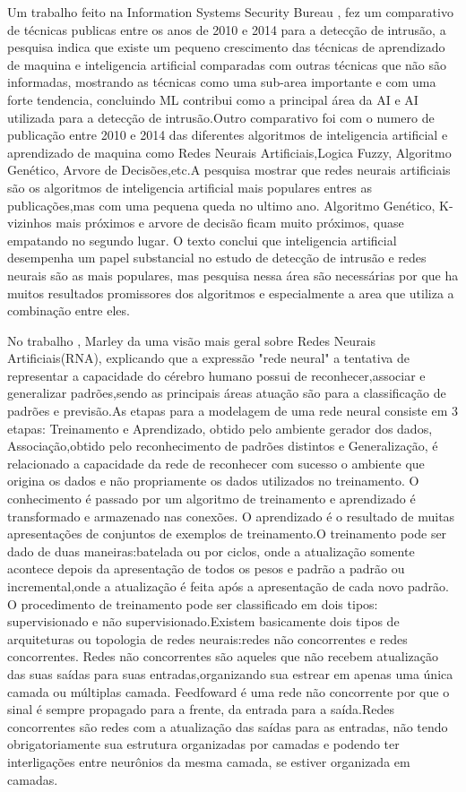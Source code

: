 \documentclass[
	12pt,				%
	openright,			%
	oneside,
	a4paper,			%
	english,			%
	french,				%
	spanish,			%
	brazil				%
	]{abntex2}
\begin{document}
Um trabalho feito na Information Systems Security Bureau \cite{Stampar}, fez um comparativo de técnicas publicas entre os anos de 2010 e 2014 para a detecção de intrusão, a pesquisa indica que existe um pequeno crescimento das técnicas de aprendizado de maquina e inteligencia artificial comparadas com outras técnicas que não são informadas, mostrando as técnicas como uma sub-area importante e com uma forte tendencia, concluindo ML contribui como a principal área da AI e AI utilizada para a detecção de intrusão.Outro comparativo foi com o numero de publicação entre 2010 e 2014 das diferentes algoritmos de inteligencia artificial e aprendizado de maquina como Redes Neurais Artificiais,Logica Fuzzy, Algoritmo Genético, Arvore de Decisões,etc.A pesquisa mostrar que redes neurais artificiais são os algoritmos de inteligencia artificial mais populares entres as publicações,mas com uma pequena queda no ultimo ano. Algoritmo Genético, K-vizinhos mais próximos e arvore de decisão ficam muito próximos, quase empatando no segundo lugar. O texto conclui que inteligencia artificial desempenha um papel substancial no estudo de detecção de intrusão e redes neurais são as mais populares, mas pesquisa nessa área são necessárias por que ha muitos resultados promissores dos algoritmos e especialmente a area que utiliza a combinação entre eles.

No trabalho \cite{Marley}, Marley da uma visão mais geral sobre Redes Neurais Artificiais(RNA), explicando que a expressão "rede neural" a tentativa de representar a capacidade do cérebro humano possui de reconhecer,associar e generalizar padrões,sendo as principais áreas atuação são para a classificação de padrões e previsão.As etapas para a modelagem de uma rede neural consiste em 3 etapas: Treinamento e Aprendizado, obtido pelo ambiente gerador dos dados, Associação,obtido pelo reconhecimento de padrões distintos e Generalização, é relacionado a capacidade da rede de reconhecer com sucesso o ambiente que origina os dados e não propriamente os dados utilizados no treinamento. O conhecimento é passado por um algoritmo de treinamento e aprendizado é transformado e armazenado nas conexões. O aprendizado é o resultado de muitas apresentações de conjuntos de exemplos de treinamento.O treinamento pode ser dado de duas maneiras:batelada ou por ciclos, onde a atualização somente acontece depois da apresentação de todos os pesos e padrão a padrão ou incremental,onde a atualização é feita após a apresentação de cada novo padrão.
O procedimento de treinamento pode ser classificado em dois tipos: supervisionado e não supervisionado.Existem basicamente dois tipos  de arquiteturas ou topologia de redes neurais:redes não concorrentes e redes concorrentes.
Redes não concorrentes são aqueles que não recebem atualização das suas saídas para suas entradas,organizando sua estrear em apenas uma única camada ou múltiplas camada. Feedfoward é uma rede não concorrente por que o sinal é sempre propagado para a frente, da entrada para a saída.Redes concorrentes são redes com a atualização das saídas para as entradas, não tendo obrigatoriamente sua estrutura organizadas por camadas e podendo ter interligações entre neurônios da mesma camada, se estiver organizada em camadas. 
\end{document}
